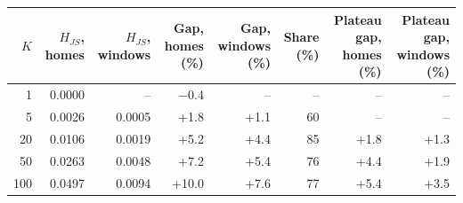 \begin{tabular}{rrrrrrrr}
\toprule
$K$ & $H_{JS}$, homes & $H_{JS}$, windows & Gap, homes (\%) & Gap, windows (\%) & Share (\%) & Plateau gap, homes (\%) & Plateau gap, windows (\%) \\
\midrule
1 & 0.0000 & -- & −0.4 & -- & -- & -- & -- \\
5 & 0.0026 & 0.0005 & +1.8 & +1.1 & 60 & -- & -- \\
20 & 0.0106 & 0.0019 & +5.2 & +4.4 & 85 & +1.8 & +1.3 \\
50 & 0.0263 & 0.0048 & +7.2 & +5.4 & 76 & +4.4 & +1.9 \\
100 & 0.0497 & 0.0094 & +10.0 & +7.6 & 77 & +5.4 & +3.5 \\
\bottomrule
\end{tabular}
